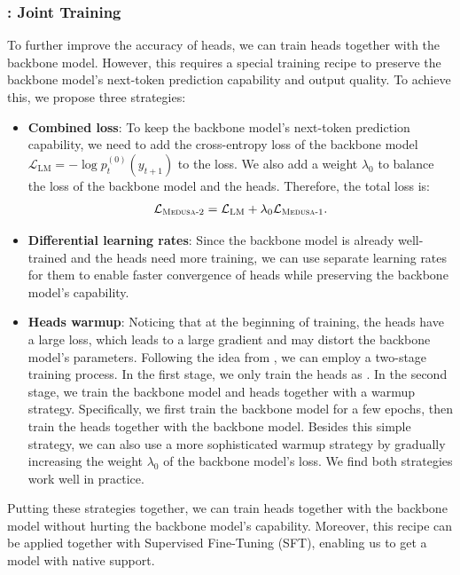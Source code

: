 \subsubsection{: Joint Training}
\label{sec:joint_training}
To further improve the accuracy of \ours heads, we can train \ours heads together with the backbone model. However, this requires a special training recipe to preserve the backbone model's next-token prediction capability and output quality. To achieve this, we propose three strategies:
\begin{itemize}
    \item \textbf{Combined loss}: To keep the backbone model's next-token prediction capability, we need to add the cross-entropy loss of the backbone model $\mathcal{L}_{\text{LM}}=-\log p_t^{(0)}(y_{t+1})$ to the \ours loss. We also add a weight $\lambda_0$ to balance the loss of the backbone model and the \ours heads. Therefore, the total loss is:
    \begin{align}
        \label{eq:loss_medusa_2}
        \mathcal{L}_{\text{\ours-2}} = \mathcal{L}_{\text{LM}} + \lambda_0\mathcal{L}_{\text{\ours-1}}.
    \end{align}
    \item \textbf{Differential learning rates}: Since the backbone model is already well-trained and the \ours heads need more training, we can use separate learning rates for them to enable faster convergence of \ours heads while preserving the backbone model's capability.
    \item \textbf{Heads warmup}: Noticing that at the beginning of training, the \ours heads have a large loss, which leads to a large gradient and may distort the backbone model's parameters. Following the idea from \citet{kumar2022finetuning}, we can employ a two-stage training process. In the first stage, we only train the \ours heads as . In the second stage, we train the backbone model and \ours heads together with a warmup strategy. Specifically, we first train the backbone model for a few epochs, then train the \ours heads together with the backbone model. Besides this simple strategy, we can also use a more sophisticated warmup strategy by gradually increasing the weight $\lambda_0$ of the backbone model's loss. We find both strategies work well in practice.
\end{itemize}
Putting these strategies together, we can train \ours heads together with the backbone model without hurting the backbone model's capability. Moreover, this recipe can be applied together with Supervised Fine-Tuning (SFT), enabling us to get a model with native \ours support.
